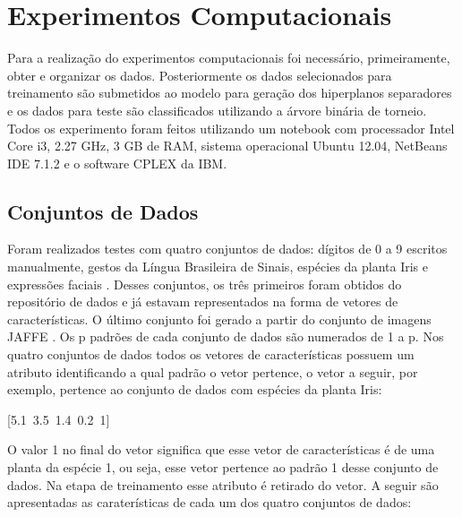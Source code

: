 \chapter{Experimentos Computacionais}
Para a realização do experimentos computacionais foi necessário, primeiramente, obter e organizar os dados. Posteriormente os dados selecionados para treinamento são submetidos ao modelo para geração dos hiperplanos separadores e os dados para teste são classificados utilizando a árvore binária de torneio. Todos os experimento foram feitos utilizando um notebook com processador Intel Core i3, 2.27 GHz, 3 GB de RAM, sistema operacional Ubuntu 12.04, NetBeans IDE 7.1.2 e o software CPLEX da IBM.

\section{Conjuntos de Dados}
Foram realizados testes com quatro conjuntos de dados: dígitos de 0 a 9 escritos manualmente, gestos da Língua Brasileira de Sinais, espécies da planta Iris e expressões faciais . Desses conjuntos, os três primeiros foram obtidos do repositório de dados  e já estavam representados na forma de vetores de características. O último conjunto foi gerado a partir do conjunto de imagens JAFFE \cite{Jaffe}. Os p padrões de cada conjunto de dados são numerados de 1 a p. Nos quatro conjuntos de dados todos os vetores de características possuem um atributo identificando a qual padrão o vetor pertence, o vetor a seguir, por exemplo, pertence ao conjunto de dados com espécies da planta Iris:

[5.1\  3.5\  1.4\ 0.2\  1]

O valor 1 no final do vetor significa que esse vetor de características é de uma planta da espécie 1, ou seja, esse vetor pertence ao padrão 1 desse conjunto de dados. 
Na etapa de treinamento esse atributo é retirado do vetor. A seguir são apresentadas as caraterísticas de cada um dos quatro conjuntos de dados:

